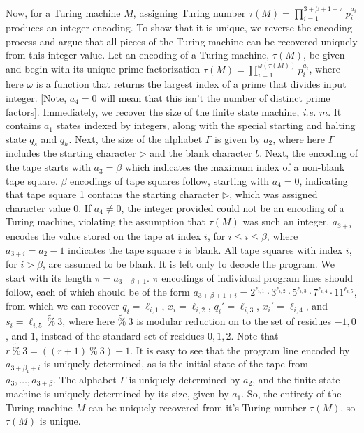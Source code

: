 Now, for a Turing machine $M$, assigning Turing number $\tau(M) = \prod\limits_{i=1}^{3+\beta+1+\pi} p_i^{a_i}$ produces an integer encoding.  To show that it is unique, we reverse the encoding process and argue that all pieces of the Turing machine can be recovered uniquely from this integer value.  Let an encoding of a Turing machine, $\tau(M)$, be given and begin with its unique prime factorization $\tau(M) = \prod\limits_{i=1}^{\omega(\tau(M))} p_i^{a_i}$, where here $\omega$ is a function that returns the largest index of a prime that divides input integer.  [Note, $a_4=0$ will mean that this isn't the number of distinct prime factors].  Immediately, we recover the size of the finite state machine, \textit{i.e.} $m$.  It contains $a_1$ states indexed by integers, along with the special starting and halting state $q_s$ and $q_h$.  Next, the size of the alphabet $\Gamma$ is given by $a_2$, where here $\Gamma$ includes the starting character $\triangleright$ and the blank character $b$.  Next, the encoding of the tape starts with $a_3=\beta$ which indicates the maximum index of a non-blank tape square.  $\beta$ encodings of tape squares follow, starting with $a_4=0$, indicating that tape square 1 contains the starting character $\triangleright$, which was assigned character value 0.  If $a_4\neq0$, the integer provided could not be an encoding of a Turing machine, violating the assumption that $\tau(M)$ was such an integer.  $a_{3+i}$ encodes the value stored on the tape at index $i$, for $i\leq i \leq \beta$, where $a_{3+i}=a_2-1$ indicates the tape square $i$ is blank.  All tape squares with index $i$, for $i > \beta$, are assumed to be blank.  It is left only to decode the program.  We start with its length $\pi = a_{3+\beta+1}$.  $\pi$ encodings of individual program lines should follow, each of which should be of the form $a_{3+\beta+1+i} = 2^{\ell_{i,1}}\cdot3^{\ell_{i,2}}\cdot5^{\ell_{i,3}}\cdot7^{\ell_{i,4}}\cdot11^{\ell_{i,5}}$, from which we can recover $q_i = \ell_{i,1}$, $x_i = \ell_{i,2}$, $q_i' = \ell_{i,3}$, $x_i'=\ell_{i,4}$, and $s_i=\ell_{i,5}~\widetilde{\%}~3$, where here $\widetilde{\%}~3$ is modular reduction on to the set of residues $-1,0$, and $1$, instead of the standard set of residues $0,1,2$.  Note that $r~\widetilde{\%}~3 = ((r+1)~ \% ~3) - 1$.  It is easy to see that the program line encoded by $a_{3+\beta_1+i}$ is uniquely determined, as is the initial state of the tape from $a_3,\ldots, a_{3+\beta}$.  The alphabet $\Gamma$ is uniquely determined by $a_2$, and the finite state machine is uniquely determined by its size, given by $a_1$.  So, the entirety of the Turing machine $M$ can be uniquely recovered from it's Turing number $\tau(M)$, so $\tau(M)$ is unique. 

